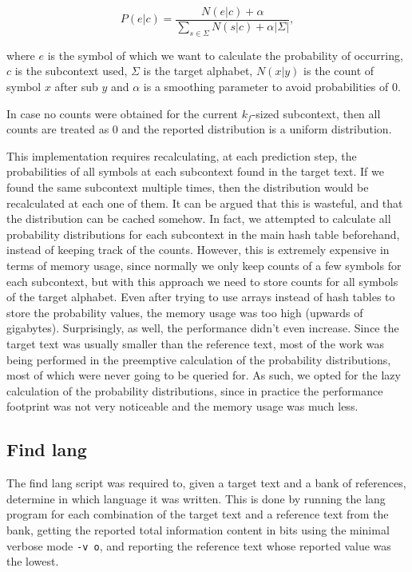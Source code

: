 \documentclass{article}
\begin{document}
$$
P(e|c) = \frac{N(e|c) + \alpha}{\sum_{s \in \Sigma}{N(s|c)} + \alpha |\Sigma|},
$$

where $e$ is the symbol of which we want to calculate the probability of occurring, $c$ is the subcontext used, $\Sigma$ is the target alphabet, $N(x|y)$ is the count of symbol $x$ after sub $y$ and $\alpha$ is a smoothing parameter to avoid probabilities of 0.

In case no counts were obtained for the current $k_f$-sized subcontext, then all counts are treated as 0 and the reported distribution is a uniform distribution.

This implementation requires recalculating, at each prediction step, the probabilities of all symbols at each subcontext found in the target text.
If we found the same subcontext multiple times, then the distribution would be recalculated at each one of them.
It can be argued that this is wasteful, and that the distribution can be cached somehow.
In fact, we attempted to calculate all probability distributions for each subcontext in the main hash table beforehand, instead of keeping track of the counts.
However, this is extremely expensive in terms of memory usage, since normally we only keep counts of a few symbols for each subcontext, but with this approach we need to store counts for all symbols of the target alphabet.
Even after trying to use arrays instead of hash tables to store the probability values, the memory usage was too high (upwards of gigabytes).
Surprisingly, as well, the performance didn't even increase.
Since the target text was usually smaller than the reference text, most of the work was being performed in the preemptive calculation of the probability distributions, most of which were never going to be queried for.
As such, we opted for the lazy calculation of the probability distributions, since in practice the performance footprint was not very noticeable and the memory usage was much less.

\subsection{Find lang}
\label{subsec:methodology_find_lang}

The find lang script was required to, given a target text and a bank of references, determine in which language it was written.
This is done by running the lang program for each combination of the target text and a reference text from the bank, getting the reported total information content in bits using the minimal verbose mode \verb|-v o|, and reporting the reference text whose reported value was the lowest.
\end{document}
